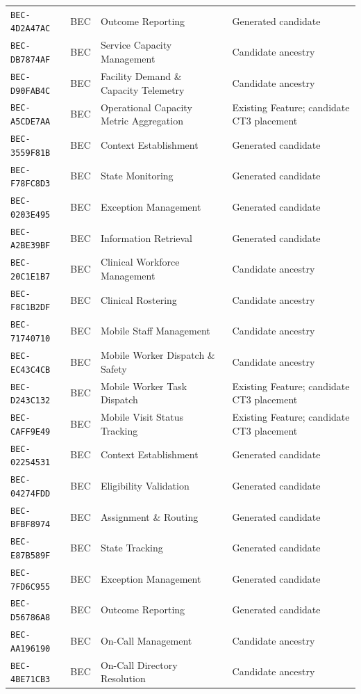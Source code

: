 \documentclass[11pt,a4paper,openany]{book}
\begin{document}
\begin{longtable}{@{}p{.19\linewidth}p{.12\linewidth}p{.39\linewidth}p{.24\linewidth}@{}}
\texttt{BEC-4D2A47AC} & BEC & Outcome Reporting & Generated candidate \\
\texttt{BEC-DB7874AF} & BEC & Service Capacity Management & Candidate ancestry \\
\texttt{BEC-D90FAB4C} & BEC & Facility Demand \& Capacity Telemetry & Candidate ancestry \\
\texttt{BEC-A5CDE7AA} & BEC & Operational Capacity Metric Aggregation & Existing Feature; candidate CT3 placement \\
\texttt{BEC-3559F81B} & BEC & Context Establishment & Generated candidate \\
\texttt{BEC-F78FC8D3} & BEC & State Monitoring & Generated candidate \\
\texttt{BEC-0203E495} & BEC & Exception Management & Generated candidate \\
\texttt{BEC-A2BE39BF} & BEC & Information Retrieval & Generated candidate \\
\texttt{BEC-20C1E1B7} & BEC & Clinical Workforce Management & Candidate ancestry \\
\texttt{BEC-F8C1B2DF} & BEC & Clinical Rostering & Candidate ancestry \\
\texttt{BEC-71740710} & BEC & Mobile Staff Management & Candidate ancestry \\
\texttt{BEC-EC43C4CB} & BEC & Mobile Worker Dispatch \& Safety & Candidate ancestry \\
\texttt{BEC-D243C132} & BEC & Mobile Worker Task Dispatch & Existing Feature; candidate CT3 placement \\
\texttt{BEC-CAFF9E49} & BEC & Mobile Visit Status Tracking & Existing Feature; candidate CT3 placement \\
\texttt{BEC-02254531} & BEC & Context Establishment & Generated candidate \\
\texttt{BEC-04274FDD} & BEC & Eligibility Validation & Generated candidate \\
\texttt{BEC-BFBF8974} & BEC & Assignment \& Routing & Generated candidate \\
\texttt{BEC-E87B589F} & BEC & State Tracking & Generated candidate \\
\texttt{BEC-7FD6C955} & BEC & Exception Management & Generated candidate \\
\texttt{BEC-D56786A8} & BEC & Outcome Reporting & Generated candidate \\
\texttt{BEC-AA196190} & BEC & On-Call Management & Candidate ancestry \\
\texttt{BEC-4BE71CB3} & BEC & On-Call Directory Resolution & Candidate ancestry \\

\end{longtable}
\end{document}
